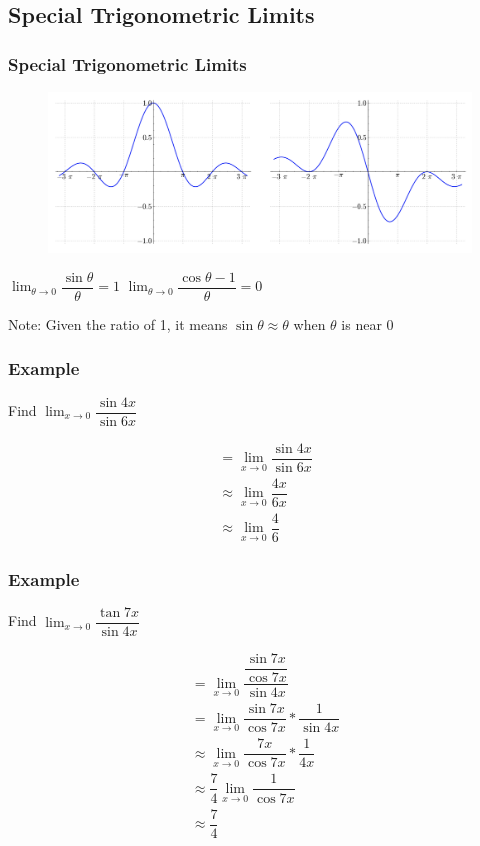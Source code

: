 \documentclass[t]{beamer}
\theoremstyle{plain}
\theoremstyle{definition}
\newcommand{\disp}{\displaystyle}
\newcommand{\limm}[1]{\displaystyle \lim_{x\to #1}}
\begin{document}
\subsection{Special Trigonometric Limits}

\begin{frame}

\frametitle{Special Trigonometric Limits}

\begin{figure}[l]
	\includegraphics[scale=.25]{fig/speciallimit}
	\label{fig}
	\end{figure}	

\hspace{4em} $\disp{\lim_{\theta\to 0}  \dfrac{\sin{\theta}}{\theta}} = 1$ \hspace{7em}  $\disp{\lim_{\theta\to 0}  \dfrac{\cos{\theta}-1}{\theta}} = 0$

\vspace{2em}

Note: Given the ratio of 1, it means $\sin{\theta} \approx \theta$ when $\theta$ is near $0$

\end{frame}

\begin{frame}
\frametitle{Example}
	Find $\limm{0}\dfrac{\sin{4x}}{\sin{6x}}$
	
	\begin{align*}
  	&= \limm{0}\dfrac{\sin{4x}}{\sin{6x}}\\
  	&\approx \limm{0} \dfrac{4x}{6x}\\
  	&\approx \limm{0} \dfrac{4}{6}
	\end{align*}	

\end{frame}

\begin{frame}
\frametitle{Example}
	Find $\limm{0}\dfrac{\tan{7x}}{\sin{4x}}$
	
	\begin{align*}
  	&= \limm{0}\dfrac{\dfrac{\sin{7x}}{\cos{7x}}}{\sin{4x}}\\
  	&= \limm{0}\dfrac{\sin{7x}}{\cos{7x}} * \dfrac{1}{\sin{4x}}\\
  	&\approx \limm{0}\dfrac{7x}{\cos{7x}} * \dfrac{1}{4x}\\
  	&\approx \dfrac{7}{4}\limm{0}\dfrac{1}{\cos{7x}}\\
  	&\approx \dfrac{7}{4}
	\end{align*}	

\end{frame}
\end{document}
